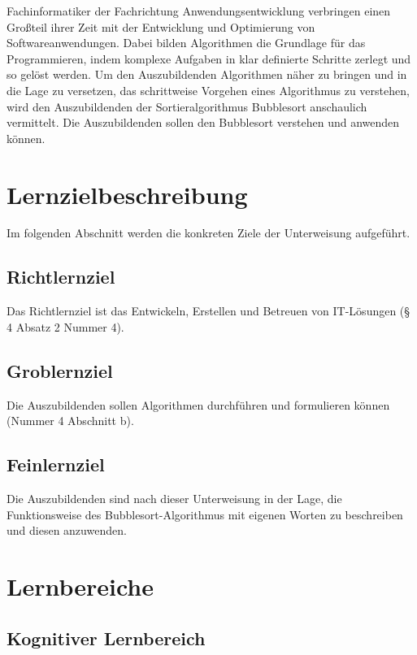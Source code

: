 Fachinformatiker der Fachrichtung Anwendungsentwicklung verbringen einen Großteil ihrer Zeit mit der Entwicklung und Optimierung von Softwareanwendungen. Dabei bilden Algorithmen die Grundlage für das Programmieren, indem komplexe Aufgaben in klar definierte Schritte zerlegt und so gelöst werden. Um den Auszubildenden Algorithmen näher zu bringen und in die Lage zu versetzen, das schrittweise Vorgehen eines Algorithmus zu verstehen, wird den Auszubildenden der Sortieralgorithmus Bubblesort anschaulich vermittelt. Die Auszubildenden sollen den Bubblesort verstehen und anwenden können.


\chapter{Lernzielbeschreibung}
Im folgenden Abschnitt werden die konkreten Ziele der Unterweisung aufgeführt.

\section{Richtlernziel}
Das Richtlernziel ist das Entwickeln, Erstellen und Betreuen von IT-Lösungen (§ 4 Absatz 2 Nummer 4).

\section{Groblernziel}
Die Auszubildenden sollen Algorithmen durchführen und formulieren können (Nummer 4 Abschnitt b).

\section{Feinlernziel}
Die Auszubildenden sind nach dieser Unterweisung in der Lage, die Funktionsweise des Bubblesort-Algorithmus mit eigenen Worten zu beschreiben und diesen anzuwenden.

\chapter{Lernbereiche}
\section{Kognitiver Lernbereich}


